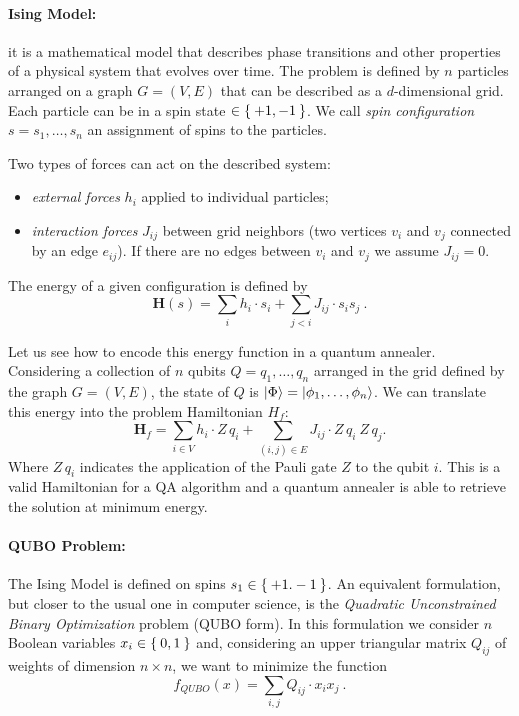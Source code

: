 \paragraph{Ising Model:} it is a mathematical model that describes phase transitions and other properties of a physical system that evolves over time. The problem is defined by $n$ particles arranged on a graph $G = (V, E)$ that can be described as a $d$-dimensional grid. Each particle can be in a spin state $\in \Set{+1, -1}$. We call \emph{spin configuration} $s = s_1,\dots, s_n$ an assignment of spins to the particles.

Two types of forces can act on the described system:
\begin{itemize}
	\item \emph{external forces} $h_i$ applied to individual particles;
	\item \emph{interaction forces} $J_{ij}$ between grid neighbors (two vertices $v_i$ and $v_j$ connected by an edge $e_{ij}$). If there are no edges between $v_i$ and $v_j$ we assume $J_{ij} = 0$.
\end{itemize}

The energy of a given configuration is defined by
\begin{equation}
	\mathbf{H}(s) =  \sum_{i}h_i\cdot s_i + \sum_{j < i} J_{ij}\cdot s_i s_j \ .
	\label{eqn:ising}
\end{equation}

Let us see how to encode this energy function in a quantum annealer. Considering a collection of $n$ qubits $Q = q_1,\dots, q_n$ arranged in the grid defined by the graph $G = (V, E)$, the state of $Q$ is $\Ket{\Phi} = \Ket{\phi_1, \dots, \phi_n}$. We can translate this energy into the problem Hamiltonian $H_f$:
\begin{equation}
	\mathbf{H}_f =  \sum_{i\in V}h_i\cdot Z\,q_i + \sum_{(i,j) \in E} J_{ij}\cdot Z\,q_i\ Z\,q_j.
\end{equation}
Where $Z\,q_i$ indicates the application of the Pauli gate $Z$ to the qubit $i$. This is a valid Hamiltonian for a QA algorithm and a quantum annealer is able to retrieve the solution at minimum energy.

\paragraph{QUBO Problem:} The Ising Model is defined on spins $s_1 \in \Set{+1. -1}$. An equivalent formulation, but closer to the usual one in computer science, is the \emph{Quadratic Unconstrained Binary Optimization} problem (QUBO form). In this formulation we consider $n$ Boolean variables $x_i \in \Set{0,1}$ and, considering an upper triangular matrix $Q_{ij}$ of weights of dimension $n\times n$, we want to minimize the function
\begin{equation}
	f_{QUBO}(x) =  \sum_{i, j}Q_{ij}\cdot x_ix_j\ .
	\label{eqn:qubo}
\end{equation}

